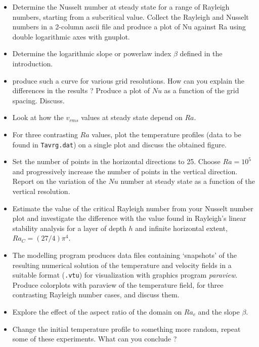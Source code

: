 \begin{itemize}
\item Determine the Nusselt number at steady state for a range of Rayleigh numbers, 
starting from a subcritical value. 
Collect the Rayleigh and Nusselt numbers in a 2-column ascii file and produce a plot of Nu against Ra using double logarithmic axes with
gnuplot.
\item Determine the logarithmic slope or powerlaw index $\beta$ defined in the introduction.

\item produce such a curve for various grid resolutions. How can you explain the differences in the results ? Produce a plot 
of $Nu$ as a function of the grid spacing. Discuss.

\item Look at how the $v_{rms}$ values at steady state depend on $Ra$. 

\item For three contrasting $Ra$ values, plot the temperature profiles (data to be found in {\tt Tavrg.dat}) on a single plot and discuss the obtained figure.

\item Set the number of points in the horizontal directions to 25. Choose $Ra=10^5$ and progressively increase the number 
of points in the vertical direction. Report on the variation of the $Nu$ number at steady state as a function of the vertical
resolution.

\item Estimate the value of the critical Rayleigh number from your Nusselt number plot and investigate the 
difference with the value found in Rayleigh's linear stability analysis for a layer of depth $h$ and infinite horizontal extent, 
$Ra_C = (27/4)  \pi^4$.

\item The modelling program produces data files containing ‘snapshots’ of the resulting numerical solution 
of the temperature and velocity fields in a suitable format ({\tt .vtu}) for visualization with graphics program {\sl paraview}. 
Produce colorplots with paraview of the temperature field, for three contrasting Rayleigh number cases, and discuss them.

\item Explore the effect of the aspect ratio of the domain on $Ra_c$ and the slope $\beta$.

\item Change the initial temperature profile to something more random, repeat some of these experiments. What can you conclude ?

\end{itemize}



